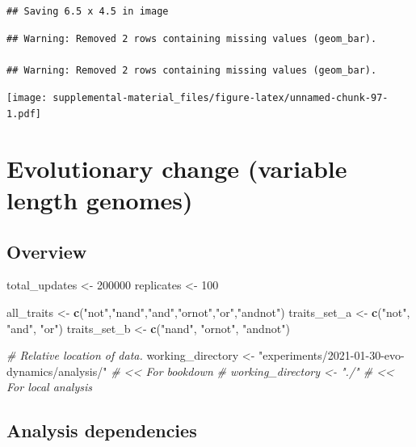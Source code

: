 \documentclass[]{book}
\newenvironment{Shaded}{\begin{snugshade}}{\end{snugshade}}
\newcommand{\CommentTok}[1]{\textcolor[rgb]{0.56,0.35,0.01}{\textit{#1}}}
\newcommand{\DecValTok}[1]{\textcolor[rgb]{0.00,0.00,0.81}{#1}}
\newcommand{\KeywordTok}[1]{\textcolor[rgb]{0.13,0.29,0.53}{\textbf{#1}}}
\newcommand{\NormalTok}[1]{#1}
\newcommand{\StringTok}[1]{\textcolor[rgb]{0.31,0.60,0.02}{#1}}
\begin{document}
\begin{verbatim}
## Saving 6.5 x 4.5 in image
\end{verbatim}

\begin{verbatim}
## Warning: Removed 2 rows containing missing values (geom_bar).

## Warning: Removed 2 rows containing missing values (geom_bar).
\end{verbatim}

\texttt{[image: supplemental-material\_files/figure-latex/unnamed-chunk-97-1.pdf]}

\hypertarget{evolutionary-change-variable-length-genomes}{%
\chapter{Evolutionary change (variable length genomes)}\label{evolutionary-change-variable-length-genomes}}

\hypertarget{overview-5}{%
\section{Overview}\label{overview-5}}

\begin{Shaded}
\begin{Highlighting}[]
\NormalTok{total_updates <-}\StringTok{ }\DecValTok{200000}
\NormalTok{replicates <-}\StringTok{ }\DecValTok{100}

\NormalTok{all_traits <-}\StringTok{ }\KeywordTok{c}\NormalTok{(}\StringTok{"not"}\NormalTok{,}\StringTok{"nand"}\NormalTok{,}\StringTok{"and"}\NormalTok{,}\StringTok{"ornot"}\NormalTok{,}\StringTok{"or"}\NormalTok{,}\StringTok{"andnot"}\NormalTok{)}
\NormalTok{traits_set_a <-}\StringTok{ }\KeywordTok{c}\NormalTok{(}\StringTok{"not"}\NormalTok{, }\StringTok{"and"}\NormalTok{, }\StringTok{"or"}\NormalTok{)}
\NormalTok{traits_set_b <-}\StringTok{ }\KeywordTok{c}\NormalTok{(}\StringTok{"nand"}\NormalTok{, }\StringTok{"ornot"}\NormalTok{, }\StringTok{"andnot"}\NormalTok{)}

\CommentTok{# Relative location of data.}
\NormalTok{working_directory <-}\StringTok{ "experiments/2021-01-30-evo-dynamics/analysis/"} \CommentTok{# << For bookdown}
\CommentTok{# working_directory <- "./"                                              # << For local analysis}
\end{Highlighting}
\end{Shaded}

\hypertarget{analysis-dependencies-5}{%
\section{Analysis dependencies}\label{analysis-dependencies-5}}
\end{document}
